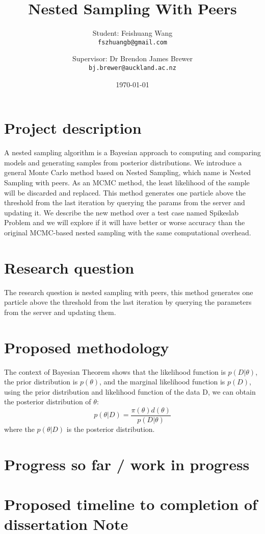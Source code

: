 \documentclass{article}
\title{Nested Sampling With Peers}
\author{
  Student: Feishuang Wang\\
  \texttt{fszhuangb@gmail.com}
  \and
  Supervisor: Dr Brendon James Brewer\\
  \texttt{bj.brewer@auckland.ac.nz}
}
\date{\today}
\begin{document}
\maketitle

\section{Project description}
A nested sampling algorithm is a Bayesian approach to computing and comparing models and generating samples from posterior distributions. We introduce a general Monte Carlo method based on Nested Sampling, which name is Nested Sampling with peers. As an MCMC method, the least likelihood of the sample will be discarded and replaced. This method generates one particle above the threshold from the last iteration by querying the params from the server and updating it. We describe the new method over a test case named Spikeslab Problem and we will explore if it will have better or worse accuracy than the original MCMC-based nested sampling with the same computational overhead.
\section{Research question}
The research question is nested sampling with peers,  this method generates one particle above the threshold from the last iteration by querying the parameters from the server and updating them. 
\section{Proposed methodology}
The context of Bayesian Theorem shows that the likelihood function is $p(D|\theta)$, the prior distribution is 
$p(\theta)$, and the marginal likelihood function is $p(D)$, using the prior distribution and
likelihood function of the data D, we can obtain the posterior distribution of $\theta$:
\begin{equation}
    p(\theta|D) = \frac{\pi(\theta)d(\theta)}{p(D|\theta)}
\end{equation}
where the $p(\theta|D)$ is the posterior distribution.


\section{ Progress so far / work in progress}
\section{ Proposed timeline to completion of dissertation Note}
\end{document}
